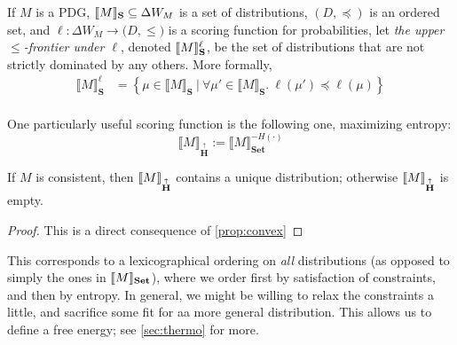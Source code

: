 \documentclass{article}
\newcommand{\MN}{PDG}%
\newcommand\Set{\textbf{Set}}
\newcommand\MaxEnt{{\overset{\uparrow}{\mathbf H}}}
\begin{document}
	\begin{defn}
		If  $M$ is a \MN, $\llbracket M\rrbracket_{\mathbf S} \subseteq \Delta W_{M}$ is a set of distributions, $(D, \preceq)$ is an ordered set, and $\ell : \Delta W_{M} \to \mathbb (D, \leq)$ is a scoring function for probabilities, let \emph{the upper $\leq$-frontier under $\ell$}, denoted $\llbracket M\rrbracket_{\mathbf S}^\ell$, be the set of distributions that are not strictly dominated by any others. More formally,
		\begin{align*}
			\llbracket M \rrbracket_{\mathbf S}^\ell &=  \left\{\mu \in \llbracket M \rrbracket_{\mathbf S} ~\Big|~ \forall \mu' \in \llbracket M \rrbracket_{\mathbf S}.~ \ell(\mu') \preceq \ell(\mu)  \right\} \\
		\end{align*}
	\end{defn}

	
	One particularly useful scoring function is the following one, maximizing entropy:
	\[ \Big\llbracket M \Big\rrbracket_\MaxEnt := \Big\llbracket M \Big\rrbracket_\Set^{-H(\cdot)} \]

	\begin{theorem} 
		If $M$ is consistent, then $\bbr{M}_\MaxEnt$ contains a unique distribution; otherwise $\bbr{M}_\MaxEnt$ is empty.
	\end{theorem}
	\begin{proof}
		\vspace{-1em}
		This is a direct consequence of  \cref{prop:convex}
	\end{proof}

	
	This corresponds to a lexicographical ordering on \emph{all} distributions (as opposed to simply the ones in $\bbr{M}_\Set$), where we order first by satisfaction of constraints, and then by entropy. In general, we might be willing to relax the constraints a little, and sacrifice some fit for aa more general distribution. This allows us to define a free energy; see \cref{sec:thermo} for more.
	
\end{document}
